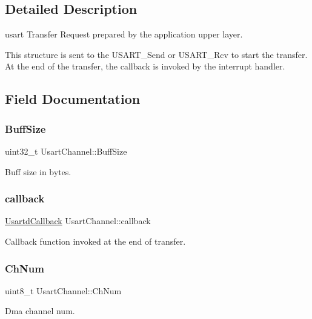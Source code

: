 \subsection{Detailed Description}
usart Transfer Request prepared by the application upper layer. 

This structure is sent to the U\+S\+A\+R\+T\+\_\+\+Send or U\+S\+A\+R\+T\+\_\+\+Rcv to start the transfer. At the end of the transfer, the callback is invoked by the interrupt handler. 

\subsection{Field Documentation}
\mbox{\label{structUsartChannel_a15dff04dc63938048bc81783c82171d1}} 
\subsubsection{\texorpdfstring{BuffSize}{BuffSize}}
{\footnotesize\ttfamily uint32\+\_\+t Usart\+Channel\+::\+Buff\+Size}

Buff size in bytes. \mbox{\label{structUsartChannel_a3d9d768214aa1e00871d9db20d130b2e}} 
\subsubsection{\texorpdfstring{callback}{callback}}
{\footnotesize\ttfamily \mbox{\hyperlink{usart__dma_8h_a8a7d4dd5c8ed169acfb5acad786dcc43}{Usartd\+Callback}} Usart\+Channel\+::callback}

Callback function invoked at the end of transfer. \mbox{\label{structUsartChannel_a6b99be2ca3dc13a6aeb32ba1c1547146}} 
\subsubsection{\texorpdfstring{ChNum}{ChNum}}
{\footnotesize\ttfamily uint8\+\_\+t Usart\+Channel\+::\+Ch\+Num}

Dma channel num. \mbox{\label{structUsartChannel_aa3c51121c8e00da758ecca2bb9aaa39f}} 
